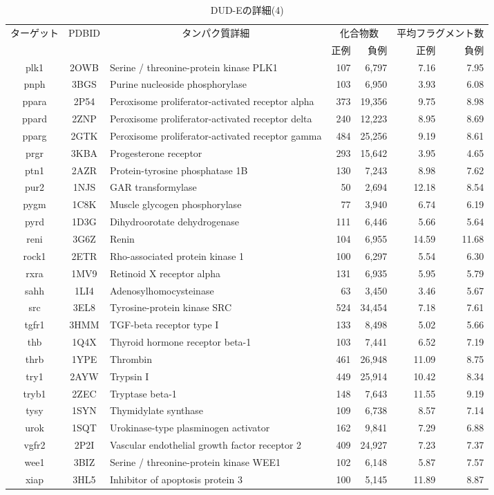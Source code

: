 \begin{table}[t] \centering
	\caption{DUD-Eの詳細(4)}
	\label{tb:dude_description:4}
	\begin{tabular}{c|c|p{6cm}|rr|rr}
	\hline
	\multirow{2}{*}{ターゲット}	&\multirow{2}{*}{PDBID}	&\multicolumn{1}{c|}{\multirow{2}{*}{タンパク質詳細}}	&\multicolumn{2}{c|}{化合物数}	&\multicolumn{2}{c}{平均フラグメント数}		\\
							&					&											&正例	&負例				&正例	&負例						\\ \hline
plk1&2OWB&Serine / threonine-protein kinase PLK1&107&6,797&7.16&7.95 \\
pnph&3BGS&Purine nucleoside phosphorylase&103&6,950&3.93&6.08 \\
ppara&2P54&Peroxisome proliferator-activated receptor alpha&373&19,356&9.75&8.98 \\
ppard&2ZNP&Peroxisome proliferator-activated receptor delta&240&12,223&8.95&8.69 \\
pparg&2GTK&Peroxisome proliferator-activated receptor gamma&484&25,256&9.19&8.61 \\
prgr&3KBA&Progesterone receptor&293&15,642&3.95&4.65 \\
ptn1&2AZR&Protein-tyrosine phosphatase 1B&130&7,243&8.98&7.62 \\
pur2&1NJS&GAR transformylase&50&2,694&12.18&8.54 \\
pygm&1C8K&Muscle glycogen phosphorylase&77&3,940&6.74&6.19 \\
pyrd&1D3G&Dihydroorotate dehydrogenase&111&6,446&5.66&5.64 \\
reni&3G6Z&Renin&104&6,955&14.59&11.68 \\
rock1&2ETR&Rho-associated protein kinase 1&100&6,297&5.54&6.30 \\
rxra&1MV9&Retinoid X receptor alpha&131&6,935&5.95&5.79 \\
sahh&1LI4&Adenosylhomocysteinase&63&3,450&3.46&5.67 \\
src&3EL8&Tyrosine-protein kinase SRC&524&34,454&7.18&7.61 \\
tgfr1&3HMM&TGF-beta receptor type I&133&8,498&5.02&5.66 \\
thb&1Q4X&Thyroid hormone receptor beta-1&103&7,441&6.52&7.19 \\
thrb&1YPE&Thrombin&461&26,948&11.09&8.75 \\
try1&2AYW&Trypsin I&449&25,914&10.42&8.34 \\
tryb1&2ZEC&Tryptase beta-1&148&7,643&11.55&9.19 \\
tysy&1SYN&Thymidylate synthase&109&6,738&8.57&7.14 \\
urok&1SQT&Urokinase-type plasminogen activator&162&9,841&7.29&6.88 \\
vgfr2&2P2I&Vascular endothelial growth factor receptor 2&409&24,927&7.23&7.37 \\
wee1&3BIZ&Serine / threonine-protein kinase WEE1&102&6,148&5.87&7.57 \\
xiap&3HL5&Inhibitor of apoptosis protein 3&100&5,145&11.89&8.87 \\ \hline
	\end{tabular}
\end{table}

